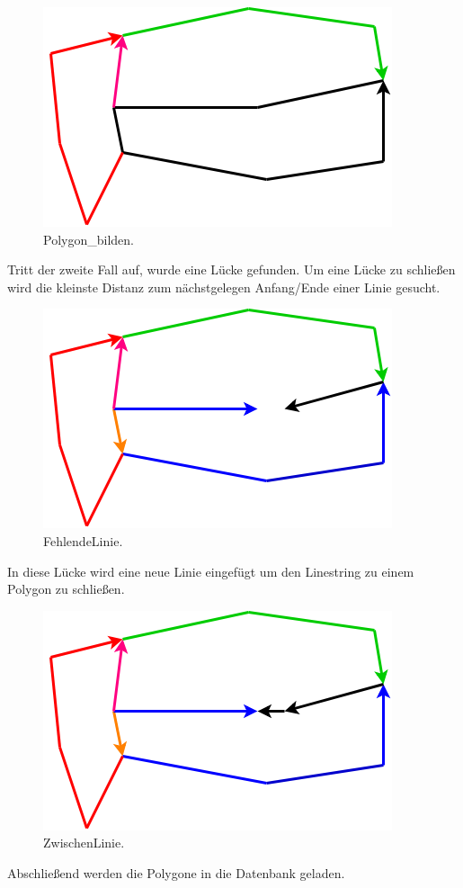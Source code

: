 \documentclass[a4paper, 12pt]{article}
\begin{document}
\begin{figure}[H]
  \includegraphics[scale=0.7]{Dokumentation/Polygon.png}
  \caption{Polygon_bilden.}
  \label{fig:Polygon_bilden}
\end{figure}
 Tritt der zweite Fall auf, wurde eine Lücke gefunden. Um eine Lücke zu schließen wird die kleinste Distanz zum nächstgelegen Anfang/Ende einer Linie gesucht.
\begin{figure}[H]
  \includegraphics[scale=0.7]{Dokumentation/FehlendeLinie.png}
  \caption{FehlendeLinie.}
  \label{fig:FehlendeLinie}
\end{figure}
In diese Lücke wird eine neue Linie eingefügt um den Linestring zu einem Polygon zu schließen.
\begin{figure}[H]
  \includegraphics[scale=0.7]{Dokumentation/ZwischenLinie.png}
  \caption{ZwischenLinie.}
  \label{fig:ZwischenLinie}
\end{figure}
Abschließend werden die Polygone in die Datenbank geladen.
	\newpage
\end{document}

